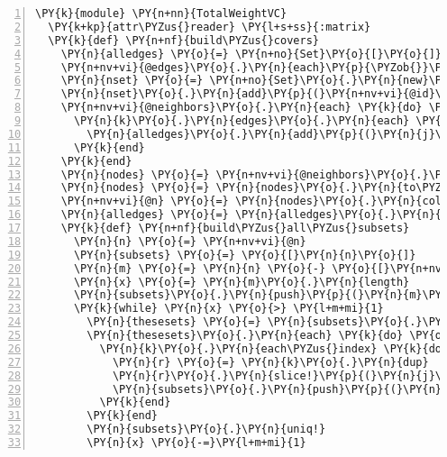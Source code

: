 \begin{Verbatim}[commandchars=\\\{\},numbers=left,firstnumber=1,stepnumber=1,xleftmargin=7mm, fontsize=\small]
\PY{k}{module} \PY{n+nn}{TotalWeightVC}
  \PY{k+kp}{attr\PYZus{}reader} \PY{l+s+ss}{:matrix}
  \PY{k}{def} \PY{n+nf}{build\PYZus{}covers}
    \PY{n}{alledges} \PY{o}{=} \PY{n+no}{Set}\PY{o}{[}\PY{o}{]}
    \PY{n+nv+vi}{@edges}\PY{o}{.}\PY{n}{each}\PY{p}{\PYZob{}}\PY{o}{|}\PY{n}{k}\PY{o}{|} \PY{n}{alledges}\PY{o}{.}\PY{n}{add}\PY{p}{(}\PY{n}{k}\PY{p}{)}\PY{p}{\PYZcb{}}
    \PY{n}{nset} \PY{o}{=} \PY{n+no}{Set}\PY{o}{.}\PY{n}{new}\PY{p}{(}\PY{n+nv+vi}{@neighbors}\PY{o}{.}\PY{n}{collect}\PY{p}{\PYZob{}}\PY{o}{|}\PY{n}{k}\PY{o}{|} \PY{n}{k}\PY{o}{.}\PY{n}{id}\PY{p}{\PYZcb{}}\PY{p}{)}
    \PY{n}{nset}\PY{o}{.}\PY{n}{add}\PY{p}{(}\PY{n+nv+vi}{@id}\PY{p}{)}
    \PY{n+nv+vi}{@neighbors}\PY{o}{.}\PY{n}{each} \PY{k}{do} \PY{o}{|}\PY{n}{k}\PY{o}{|} 
      \PY{n}{k}\PY{o}{.}\PY{n}{edges}\PY{o}{.}\PY{n}{each} \PY{k}{do} \PY{o}{|}\PY{n}{j}\PY{o}{|} 
        \PY{n}{alledges}\PY{o}{.}\PY{n}{add}\PY{p}{(}\PY{n}{j}\PY{p}{)} \PY{k}{if} \PY{n}{j}\PY{o}{.}\PY{n}{proper\PYZus{}subset?}\PY{p}{(}\PY{n}{nset}\PY{p}{)}
      \PY{k}{end}
    \PY{k}{end}
    \PY{n}{nodes} \PY{o}{=} \PY{n+nv+vi}{@neighbors}\PY{o}{.}\PY{n}{to\PYZus{}set}\PY{o}{.}\PY{n}{add}\PY{p}{(}\PY{n+nb}{self}\PY{p}{)}
    \PY{n}{nodes} \PY{o}{=} \PY{n}{nodes}\PY{o}{.}\PY{n}{to\PYZus{}a}
    \PY{n+nv+vi}{@n} \PY{o}{=} \PY{n}{nodes}\PY{o}{.}\PY{n}{collect}\PY{p}{\PYZob{}}\PY{o}{|}\PY{n}{k}\PY{o}{|} \PY{n}{k}\PY{o}{.}\PY{n}{id}\PY{p}{\PYZcb{}}
    \PY{n}{alledges} \PY{o}{=} \PY{n}{alledges}\PY{o}{.}\PY{n}{to\PYZus{}a}    
    \PY{k}{def} \PY{n+nf}{build\PYZus{}all\PYZus{}subsets}
      \PY{n}{n} \PY{o}{=} \PY{n+nv+vi}{@n}
      \PY{n}{subsets} \PY{o}{=} \PY{o}{[}\PY{n}{n}\PY{o}{]}
      \PY{n}{m} \PY{o}{=} \PY{n}{n} \PY{o}{-} \PY{o}{[}\PY{n+nv+vi}{@id}\PY{o}{]}
      \PY{n}{x} \PY{o}{=} \PY{n}{m}\PY{o}{.}\PY{n}{length}
      \PY{n}{subsets}\PY{o}{.}\PY{n}{push}\PY{p}{(}\PY{n}{m}\PY{p}{)}
      \PY{k}{while} \PY{n}{x} \PY{o}{>} \PY{l+m+mi}{1}
        \PY{n}{thesesets} \PY{o}{=} \PY{n}{subsets}\PY{o}{.}\PY{n}{select}\PY{p}{\PYZob{}}\PY{o}{|}\PY{n}{k}\PY{o}{|} \PY{n}{k}\PY{o}{.}\PY{n}{length} \PY{o}{==} \PY{n}{x}\PY{p}{\PYZcb{}}
        \PY{n}{thesesets}\PY{o}{.}\PY{n}{each} \PY{k}{do} \PY{o}{|}\PY{n}{k}\PY{o}{|}
          \PY{n}{k}\PY{o}{.}\PY{n}{each\PYZus{}index} \PY{k}{do} \PY{o}{|}\PY{n}{j}\PY{o}{|}
            \PY{n}{r} \PY{o}{=} \PY{n}{k}\PY{o}{.}\PY{n}{dup}
            \PY{n}{r}\PY{o}{.}\PY{n}{slice!}\PY{p}{(}\PY{n}{j}\PY{p}{)}
            \PY{n}{subsets}\PY{o}{.}\PY{n}{push}\PY{p}{(}\PY{n}{r}\PY{p}{)}
          \PY{k}{end}
        \PY{k}{end}
        \PY{n}{subsets}\PY{o}{.}\PY{n}{uniq!}
        \PY{n}{x} \PY{o}{-=}\PY{l+m+mi}{1}

\end{Verbatim}
